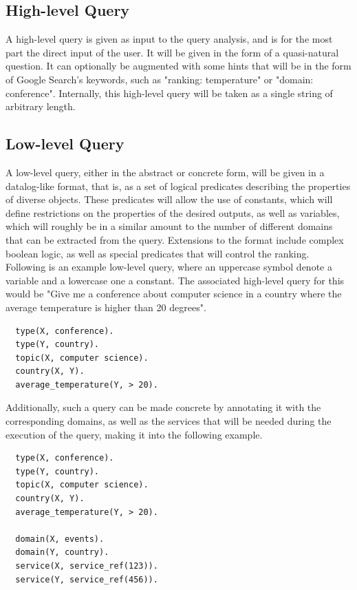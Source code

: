 \subsection{High-level Query} %
\label{sub:high_level_query}

A high-level query is given as input to the query analysis, and is for the most part the direct input of the user. It will be given in the form of a quasi-natural question. It can optionally be augmented with some hints that will be in the form of Google Search's keywords, such as "ranking: temperature" or "domain: conference". Internally, this high-level query will be taken as a single string of arbitrary length.


\subsection{Low-level Query} %
\label{sub:low_level_query}

A low-level query, either in the abstract or concrete form, will be given in a datalog-like format, that is, as a set of logical predicates describing the properties of diverse objects. These predicates will allow the use of constants, which will define restrictions on the properties of the desired outputs, as well as variables, which will roughly be in a similar amount to the number of different domains that can be extracted from the query. Extensions to the format include complex boolean logic, as well as special predicates that will control the ranking.  Following is an example low-level query, where an uppercase symbol denote a variable and a lowercase one a constant. The associated high-level query for this would be "Give me a conference about computer science in a country where the average temperature is higher than 20 degrees".

\begin{verbatim}
  type(X, conference).
  type(Y, country).
  topic(X, computer science).
  country(X, Y).
  average_temperature(Y, > 20).
\end{verbatim}

Additionally, such a query can be made concrete by annotating it with the corresponding domains, as well as the services that will be needed during the execution of the query, making it into the following example.

\begin{verbatim}
  type(X, conference).
  type(Y, country).
  topic(X, computer science).
  country(X, Y).
  average_temperature(Y, > 20).
  
  domain(X, events).
  domain(Y, country).
  service(X, service_ref(123)).
  service(Y, service_ref(456)).
\end{verbatim}

